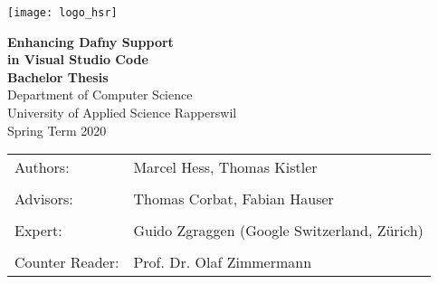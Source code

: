 \begin{titlepage}
\thispagestyle{empty}

\newcommand\thesisAuthors{Marcel Hess, Thomas Kistler}
\newcommand\thesisTitleFirst{Enhancing Dafny Support}
\newcommand\thesisTitleNd{in Visual Studio Code}
\newcommand\thesisSubject{Bachelor Thesis}
\newcommand\thesisUniversity{University of Applied Science Rapperswil}
\newcommand\thesisDepartment{Department of Computer Science}
\newcommand\thesisAdvisors{Thomas Corbat, Fabian Hauser}
\newcommand\thesisExpert{Guido Zgraggen (Google Switzerland, Zürich)}
\newcommand\thesisPeriod{Spring Term 2020}
\newcommand\thesisReader{Prof. Dr. Olaf Zimmermann}

    \texttt{[image: logo\_hsr]}\\[40mm]

    \begin{center}

    	\Huge
    	\textbf{\thesisTitleFirst} \\
    	\textbf{\thesisTitleNd} \\[5mm]
    	\textbf{\thesisSubject} \\[20mm]

    	\LARGE
    	\thesisDepartment\\
    	\thesisUniversity\\[10mm]

    	\thesisPeriod \\[15mm]

    	\vfill

    \end{center}

\begin{tabularx}{\textwidth}{l X}
			\large Authors: & \large{ \thesisAuthors} \tabularnewline
			\tabularnewline
			\large Advisors: & \large{\thesisAdvisors} \tabularnewline
			\tabularnewline
			\large Expert: & \large \thesisExpert \tabularnewline
			\tabularnewline
			\large Counter Reader: & \large \thesisReader
		\end{tabularx}

\end{titlepage}
